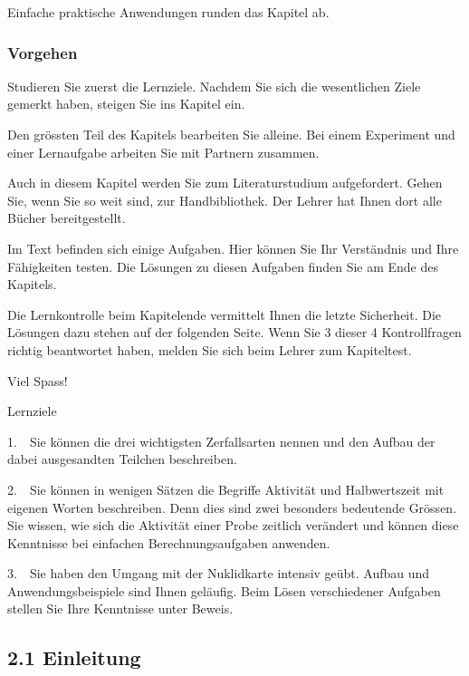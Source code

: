 \documentclass[12pt,a4paper,twoside]{article}
\begin{document}
Einfache praktische Anwendungen runden das Kapitel ab.

\subsubsection*{Vorgehen}
Studieren Sie zuerst die Lernziele. Nachdem Sie sich die wesentlichen Ziele gemerkt haben, steigen Sie ins Kapitel ein.

Den grössten Teil des Kapitels bearbeiten Sie alleine. Bei einem Experiment und einer Lernaufgabe arbeiten Sie mit Partnern zusammen. 

Auch in diesem Kapitel werden Sie zum Literaturstudium aufgefordert. Gehen Sie, wenn Sie so weit sind, zur Handbibliothek. Der Lehrer hat Ihnen dort alle Bücher bereitgestellt.

Im Text befinden sich einige Aufgaben. Hier können Sie Ihr Verständnis und Ihre Fähigkeiten testen. Die Lösungen zu diesen Aufgaben finden Sie am Ende des Kapitels.

Die Lernkontrolle beim Kapitelende vermittelt Ihnen die letzte Sicherheit. Die Lösungen dazu stehen auf der folgenden Seite. Wenn Sie 3 dieser 4 Kontrollfragen richtig beantwortet haben, melden Sie sich beim Lehrer zum Kapiteltest.

Viel Spass!


\bigskip

\clearpage
\bigskip

Lernziele


\bigskip

1.\ \ Sie können die drei wichtigsten Zerfallsarten nennen und den Aufbau der dabei ausgesandten Teilchen beschreiben.

2.\ \ Sie können in wenigen Sätzen die Begriffe {\quotedblbase}Aktivität{\quotedblbase} und {\quotedblbase}Halbwertszeit{\quotedblbase} mit eigenen Worten beschreiben. Denn dies sind zwei besonders bedeutende Grössen. Sie wissen, wie sich die Aktivität einer Probe zeitlich verändert und können diese Kenntnisse bei einfachen Berechnungsaufgaben anwenden.

3.\ \ Sie haben den Umgang mit der Nuklidkarte intensiv geübt. Aufbau und Anwendungsbeispiele sind Ihnen geläufig. Beim Lösen verschiedener Aufgaben stellen Sie Ihre Kenntnisse unter Beweis.

\clearpage\subsection[2.1 Einleitung]{2.1 Einleitung}
\end{document}
